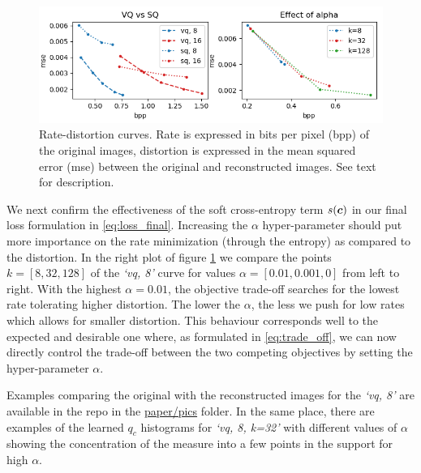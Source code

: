 \documentclass{article} %
\newcommand{\qc}{q_c}
\begin{document}
\begin{figure}[h]
\begin{center}
\includegraphics[scale=0.6]{figure1.png}
\end{center}
\caption{Rate-distortion curves. Rate is expressed in bits per pixel (bpp) of the original images, distortion is expressed in the mean squared error (mse) between the original and reconstructed images. See text for description.}\label{fig:plots}
\end{figure}

We next confirm the effectiveness of the soft cross-entropy term $s({\bm{c}})$ in our final loss formulation in \eqref{eq:loss_final}.
Increasing the $\alpha$ hyper-parameter should put more importance on the rate minimization (through the entropy) as compared to the distortion.
In the right plot of figure \ref{fig:plots} we compare the points $k=[8, 32, 128]$ of the \emph{`vq, 8'} curve for values $\alpha = [0.01, 0.001, 0]$ from left to right.
With the highest $\alpha = 0.01$, the objective trade-off searches for the lowest rate tolerating higher distortion. The lower the $\alpha$, the less we push for low rates which allows for smaller distortion. 
This behaviour corresponds well to the expected and desirable one where, as formulated in \eqref{eq:trade_off}, we can now directly control the trade-off between the two competing objectives by setting the hyper-parameter $\alpha$.

Examples comparing the original with the reconstructed images for the \emph{`vq, 8'} are available in the repo in the \href{https://bitbucket.org/dmmlgeneva/softvqae/src/master/paper/pics}{paper/pics} folder.
In the same place, there are examples of the learned $\qc$ histograms for \emph{`vq, 8, k=32'} with different values of $\alpha$ showing the concentration of the measure into a few points in the support for high $\alpha$.







\end{document}
